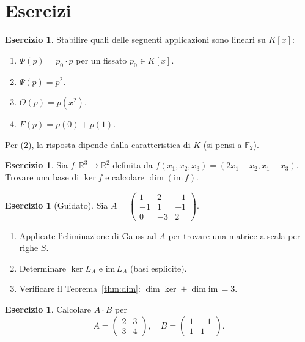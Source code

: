 \documentclass[11pt, a4paper]{book}
\theoremstyle{definition}
\newtheorem{esercizio}[definizione]{Esercizio}
\theoremstyle{plain}
\theoremstyle{remark}
\newcommand{\R}{\mathbb{R}}
\newcommand{\im}{\mathrm{im}\,}
\begin{document}
\section*{Esercizi}

\begin{esercizio}
Stabilire quali delle seguenti applicazioni sono lineari su $K[x]$:
\begin{enumerate}
  \item $\Phi(p) = p_0 \cdot p$ per un fissato $p_0 \in K[x]$.
  \item $\Psi(p) = p^2$.
  \item $\Theta(p) = p(x^2)$.
  \item $F(p) = p(0) + p(1)$.
\end{enumerate}
Per (2), la risposta dipende dalla caratteristica di $K$ (si pensi a $\mathbb{F}_2$).
\end{esercizio}

\begin{esercizio}
Sia $f \colon \R^3 \to \R^2$ definita da $f(x_1, x_2, x_3) = (2x_1 + x_2, x_1 - x_3)$. Trovare una base di $\ker f$ e calcolare $\dim(\im f)$.
\end{esercizio}

\begin{esercizio}[Guidato]
Sia $A = \begin{pmatrix} 1 & 2 & -1 \\ -1 & 1 & -1 \\ 0 & -3 & 2 \end{pmatrix}$.
\begin{enumerate}
  \item Applicate l'eliminazione di Gauss ad $A$ per trovare una matrice a scala per righe $S$.
  \item Determinare $\ker L_A$ e $\im L_A$ (basi esplicite).
  \item Verificare il Teorema~\ref{thm:dim}: $\dim\ker + \dim\im = 3$.
\end{enumerate}
\end{esercizio}

\begin{esercizio}
Calcolare $A \cdot B$ per
\[
  A = \begin{pmatrix} 2 & 3 \\ 3 & 4 \end{pmatrix}, \quad B = \begin{pmatrix} 1 & -1 \\ 1 & 1 \end{pmatrix}.
\]
\end{esercizio}
\end{document}
